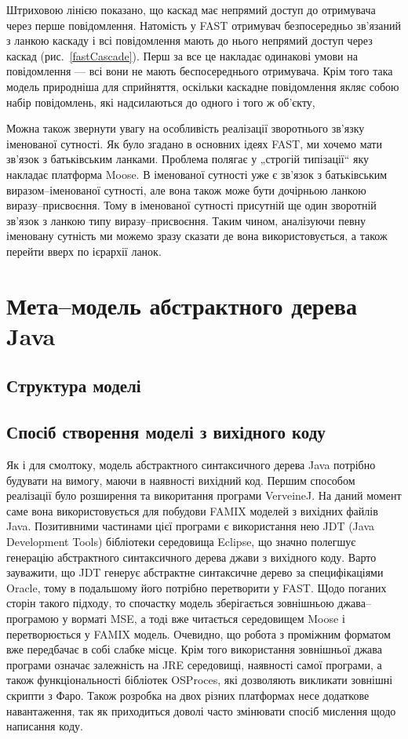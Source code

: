 \documentclass[12pt,a4paper]{article}
\begin{document}
Штриховою лінією показано, що каскад має непрямий доступ до отримувача через перше повідомлення. Натомість у FAST отримувач безпосередньо зв'язаний з ланкою каскаду і всі повідомлення мають до нього непрямий доступ через каскад (рис.~\ref{fastCascade}). Перш за все це накладає одинакові умови на повідомлення --- всі вони не мають беспосереднього отримувача. Крім того така модель природніша для сприйняття, оскільки каскадне повідомлення якляє собою набір повідомлень, які надсилаються до одного і того ж об'єкту,

Можна також звернути увагу на особливість реалізації зворотнього зв'язку іменованої сутності. Як було згадано в основних ідеях FAST, ми хочемо мати зв'язок з батьківським ланками. Проблема полягає у „строгій типізації“ яку накладає платформа Moose. В іменованої сутності уже є зв'язок з батьківським виразом--іменованої сутності, але вона також може бути дочірньою ланкою виразу--присвоєння. Тому в іменованої сутності присутній ще один зворотній зв'язок з ланкою типу виразу--присвоєння. Таким чином, аналізуючи певну іменовану сутність ми можемо зразу сказати де вона використовується, а також перейти вверх по ієрархії ланок. 

\clearpage

\section{Мета--модель абстрактного дерева Java}

\subsection{Структура моделі}

\subsection{Спосіб створення моделі з вихідного коду}
Як і для смолтоку, модель абстрактного синтаксичного дерева Java потрібно будувати на вимогу, маючи в наявності вихідний код. Першим способом реалізації було розширення та викоритання програми VerveineJ. На даний момент саме вона використовується для побудови FAMIX моделей з вихідних файлів Java. Позитивними частинами цієї програми є використання нею JDT (Java Development Tools) бібліотеки середовища Eclipse, що значно полегшує генерацію абстрактного синтаксичного дерева джави з вихідного коду. Варто зауважити, що JDT генерує абстрактне синтаксичне дерево за специфікаціями Oracle, тому в подальшому його потрібно перетворити у FAST. Щодо поганих сторін такого підходу, то спочастку модель зберігається зовнішньою джава--програмою у ворматі MSE, а тоді вже читається середовищем Moose і перетворюється у FAMIX модель. Очевидно, що робота з проміжним форматом вже передбачає в собі слабке місце. Крім того використання зовнішньої джава програми означає залежність на JRE середовищі, наявності самої програми, а також функціональності бібліотек OSProces, які дозволяють викликати зовнішні скрипти з Фаро. Також розробка на двох різних платформах несе додаткове навантаження, так як приходиться доволі часто змінювати спосіб мислення щодо написання коду.
\end{document}
